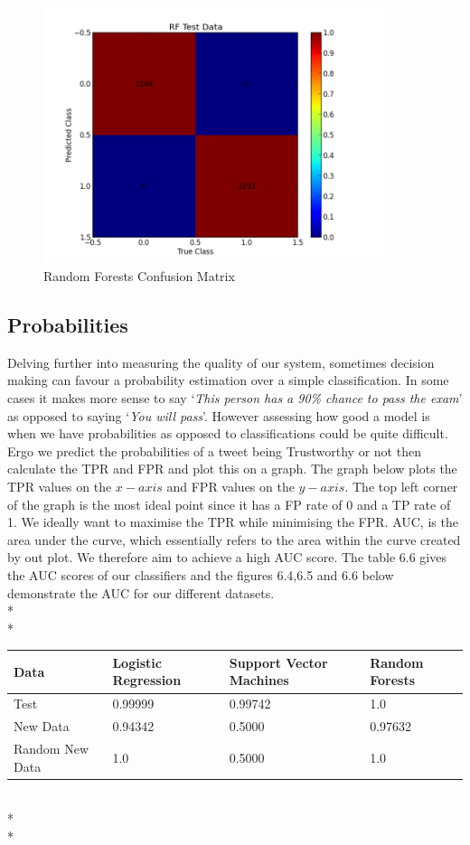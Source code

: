 \begin{figure}[!h]
 \centering
\includegraphics[width=10cm]{RFCMTestData}
  \caption[Random Forests Confusion Matrix]
   {Random Forests Confusion Matrix}
\end{figure}

\subsection{Probabilities}
Delving further into measuring the quality of our system, sometimes decision making can favour a probability estimation over a simple classification. In some cases it makes more sense to say `\textit{This person has a 90\% chance to pass the exam}' as opposed to saying `\textit{You will pass}'. However assessing how good a model is when we have probabilities as opposed to classifications could be quite difficult. Ergo we predict the probabilities of a tweet being Trustworthy or not then calculate the TPR and FPR and plot this on a graph. The graph below plots the TPR values on the $x-axis$ and FPR values on the $y-axis$. The top left corner of the graph is the most ideal point since it has a FP rate of 0 and a TP rate of 1. We ideally want to maximise the TPR while minimising the FPR. AUC, is the area under the curve, which essentially refers to the area within the curve created by out plot. We therefore aim to achieve a high AUC score. The table 6.6 gives the AUC scores of our classifiers and the figures 6.4,6.5 and 6.6 below demonstrate the AUC for our different datasets. \\*\\*

\begin{minipage}{\linewidth}
\centering
{} \label{tab:title} 
\begin{tabular}[t]{ C{1.4in} *3{C{1.4in}}}\toprule[1.5pt]
\bf Data & \bf Logistic Regression & \bf Support Vector Machines & \bf Random Forests \\\midrule
Test        &  0.99999     & 0.99742 & 1.0 \\
New Data        &  0.94342  & 0.5000  & 0.97632 \\
Random New Data & 1.0 & 0.5000 & 1.0 \\ 
\bottomrule[1.25pt]
\end {tabular}\par
\bigskip
\end{minipage}\\*\\*

